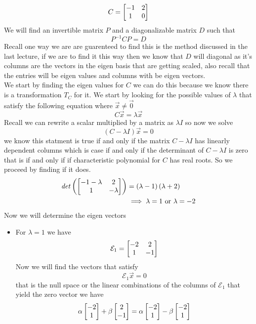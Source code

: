 \documentclass[11pt]{book}
\begin{document}
\begin{eg}
    \[
    C= \mat[b]{ -1 & 2 \\ 1 & 0 }
    \]
    We will find an invertible matrix $P$ and a diagonalizable matrix $D$ such that 
    \[
    P^{-1} CP= D
    \]
    Recall one way we are are guarenteed to find this is the method discussed in the last lecture, if we are to find it this way then we know that $D$ will diagonal as it's columns are the vectors in the eigen basis that are getting scaled, also recall that the entries will be eigen values and columns with be eigen vectors.\\
    We start by finding the eigen values for $C$ we can do this because we know there is a transformation $T_{C} $ for it. We start by looking for the possible values of $\lambda $ that satisfy the following equation where $\vec{x} \neq \vec{0} $ 
    \[
    C\vec{x} = \lambda \vec{x} 
    \]
    Recall we can rewrite a scalar multiplied by a matrix as $\lambda I$ so now we solve
    \[
        \left( C - \lambda I \right) \vec{x} = 0
    \]
    we know this statment is true if and only if the matrix $C  - \lambda I$ has linearly dependent columns which is case if and only if the determinant of $C - \lambda I$ is zero that is if and only if if characteristic polynomial for $C$ has real roots. So we proceed by finding if it does.
    \begin{align*}
        \mathit{det} \left(\mat[b]{ -1 - \lambda  & 2 \\ 1 & -\lambda  }\right) &= \left( \lambda  - 1 \right) \left( \lambda  + 2 \right)   \\ 
                                                  & \implies \lambda = 1 \text{ or } \lambda = -2
    \end{align*}
    Now we will determine the eigen vectors
    \begin{itemize}
        \item For $\lambda = 1$ we have
            \[
            \mathcal{E} _{1} = \mat[b]{ -2 & 2 \\ 1 & -1 }
            \]
            Now we will find the vectors that satisfy 
            \[
            \mathcal{E} _{1} \vec{x} = 0
            \]
            that is the null space or the linear combinations of the columns of $\mathcal{E} _{1} $ that yield the zero vector we have 
            \begin{align*}
                \alpha \mat{ -2 \\ 1 }  + \beta \mat{ 2 \\ -1 } &= \alpha \mat{ -2 \\ 1 }  - \beta \mat{ -2 \\ 1 }   \\ 

\end{align*}
\end{itemize}
\end{eg}
\end{document}
